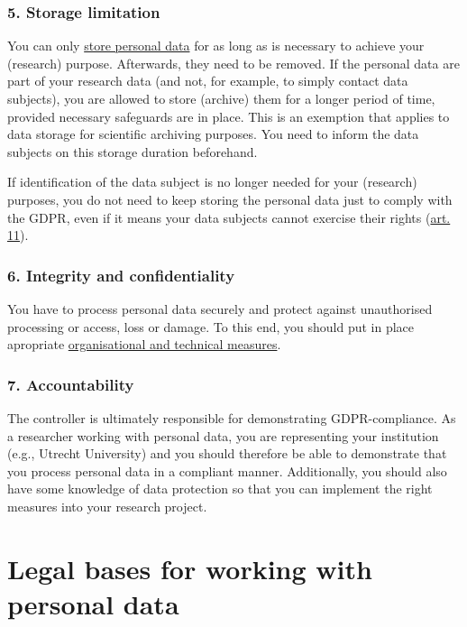 \documentclass[
]{book}
\begin{document}
\hypertarget{storage-limitation}{%
\subsubsection{5. Storage limitation}\label{storage-limitation}}

You can only \protect\hyperlink{data-storage}{store personal data} for as long as is
necessary to achieve your (research) purpose. Afterwards, they need to be
removed. If the personal data are part of your research data (and not, for
example, to simply contact data subjects), you are allowed to store (archive)
them for a longer period of time, provided necessary safeguards are in place.
This is an exemption that applies to data storage for scientific archiving
purposes. You need to inform the data subjects on this storage duration beforehand.

If identification of the data subject is no longer needed for your
(research) purposes, you do not need to keep storing the personal data just
to comply with the GDPR, even if it means your data subjects cannot exercise
their rights (\href{https://gdpr-info.eu/art-11-gdpr/}{art. 11}).

\hypertarget{integrity-and-confidentiality}{%
\subsubsection{6. Integrity and confidentiality}\label{integrity-and-confidentiality}}

You have to process personal data securely and protect against unauthorised
processing or access, loss or damage. To this end, you should put in place
apropriate \protect\hyperlink{privacy-by-design}{organisational and technical measures}.

\hypertarget{accountability}{%
\subsubsection{7. Accountability}\label{accountability}}

The controller is ultimately responsible for demonstrating GDPR-compliance. As a
researcher working with personal data, you are representing your institution
(e.g., Utrecht University) and you should therefore be able to demonstrate that
you process personal data in a compliant manner. Additionally, you should also
have some knowledge of data protection so that you can implement the right
measures into your research project.

\hypertarget{legal-basis}{%
\section{Legal bases for working with personal data}\label{legal-basis}}
\end{document}
